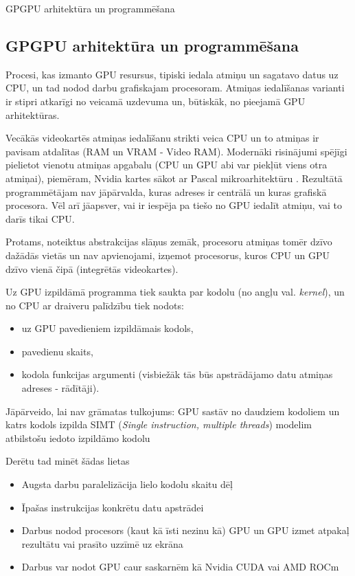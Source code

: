 \documentclass[12pt]{report}%
\theoremstyle{definition}
\begin{document}
GPGPU arhitektūra un programmēšana
\begin{center}
\chapter{GPGPU arhitektūra un programmēšana}
\end{center}

Procesi, kas izmanto GPU resursus, tipiski iedala atmiņu un sagatavo datus uz CPU, un tad nodod darbu
grafiskajam procesoram. Atmiņas iedalīšanas varianti ir stipri atkarīgi no veicamā uzdevuma un, būtiskāk, no
pieejamā GPU arhitektūras.

Vecākās videokartēs atmiņas iedalīšanu strikti veica CPU un to atmiņas ir pavisam atdalītas 
(RAM un VRAM - Video RAM). Modernāki risinājumi spējīgi pielietot vienotu
atmiņas apgabalu (CPU un GPU abi var piekļūt viens otra atmiņai), piemēram, Nvidia kartes sākot ar Pascal
mikroarhitektūru \cite{nvidia_tesla_p100}. Rezultātā programmētājam nav jāpārvalda,
kuras adreses ir centrālā un kuras grafiskā procesora. Vēl arī jāapsver, vai ir iespēja pa tiešo no GPU
iedalīt atmiņu, vai to darīs tikai CPU.

Protams, noteiktus abstrakcijas slāņus zemāk, procesoru atmiņas tomēr dzīvo dažādās vietās un nav apvienojami,
izņemot procesorus, kuros CPU un GPU dzīvo vienā čipā (integrētās videokartes).

Uz GPU izpildāmā programma tiek saukta par kodolu (no angļu val. \textit{kernel}), un no CPU ar draiveru
palīdzību tiek nodots:
\begin{itemize}
    \item uz GPU pavedieniem izpildāmais kodols,
    \item pavedienu skaits,
    \item kodola funkcijas argumenti (visbiežāk tās būs apstrādājamo datu atmiņas adreses - rādītāji).
\end{itemize}

Jāpārveido, lai nav grāmatas tulkojums:    GPU sastāv no daudziem kodoliem un katrs kodols izpilda
SIMT (\textit{Single instruction, multiple threads}) modelim atbilstošu iedoto izpildāmo kodolu




Derētu tad minēt šādas lietas
\begin{itemize}
   \item Augsta darbu paralelizācija lielo kodolu skaitu dēļ
   \item Īpašas instrukcijas konkrētu datu apstrādei
   \item Darbus nodod procesors (kaut kā īsti nezinu kā) GPU un GPU izmet atpakaļ rezultātu vai prasīto uzzīmē uz ekrāna
   \item Darbus var nodot GPU caur saskarnēm kā Nvidia CUDA vai AMD ROCm
\end{itemize}
\end{document}
